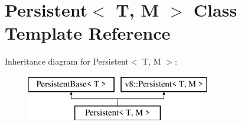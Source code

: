 \hypertarget{class_persistent}{}\section{Persistent$<$ T, M $>$ Class Template Reference}
\label{class_persistent}
Inheritance diagram for Persistent$<$ T, M $>$\+:\begin{figure}[H]
\begin{center}
\leavevmode
\includegraphics[height=2.000000cm]{class_persistent}
\end{center}
\end{figure}
